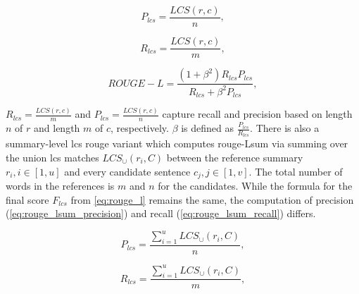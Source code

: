 \begin{equation}
P_{lcs} = \frac{LCS(r,c)}{n},
\label{eq:rouge_l_precision}
\end{equation}

\begin{equation}
R_{lcs} = \frac{LCS(r,c)}{m},
\label{eq:rouge_l_recall}
\end{equation}

\begin{equation}
ROUGE-L = \frac{(1 + \beta^2)R_{lcs}P_{lcs}}{R_{lcs} + \beta^2 P_{lcs}},
\label{eq:rouge_l}
\end{equation}

$R_{lcs} = \frac{LCS(r,c)}{m}$ and $P_{lcs} = \frac{LCS(r,c)}{n}$ capture recall and precision based on length $n$ of $r$ and length $m$ of $c$, respectively.
$\beta$ is defined as $\frac{P_{lcs}}{R_{lcs}}$.
There is also a summary-level \ac{lcs} \ac{rouge} variant which computes \ac{rouge}-Lsum via summing over the union \ac{lcs} matches $LCS_\cup(r_i,C)$ between the reference summary $r_i, i \in [1,u]$ and every candidate sentence $c_j, j \in [1,v]$.
The total number of words in the references is $m$ and $n$ for the candidates.
While the formula for the final score $F_{lcs}$ from \autoref{eq:rouge_l} remains the same, the computation of precision (\autoref{eq:rouge_lsum_precision}) and recall (\autoref{eq:rouge_lsum_recall}) differs.

\begin{equation}
P_{lcs} = \frac{\sum_{i=1}^{u}LCS_\cup(r_i,C)}{n},
\label{eq:rouge_lsum_precision}
\end{equation}

\begin{equation}
R_{lcs} = \frac{\sum_{i=1}^{u}LCS_\cup(r_i,C)}{m},
\label{eq:rouge_lsum_recall}
\end{equation}

